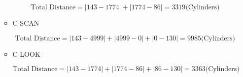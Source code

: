 \begin{enumerate}
\begin{itemize}
        $$
        \text{Total Distance} = |143 - 1774| + |1774 - 86| = 3319 \text{(Cylinders)}
        $$
        
        \item C-SCAN
        
        $$
        \text{Total Distance} = |143 - 4999| + |4999 - 0| + |0 - 130| = 9985 \text{(Cylinders)}
        $$
        
        \item C-LOOK
        
        $$
        \text{Total Distance} = |143 - 1774| + |1774 - 86| + |86 - 130| = 3363 \text{(Cylinders)}
        $$
        
    \end{itemize}
\end{enumerate}